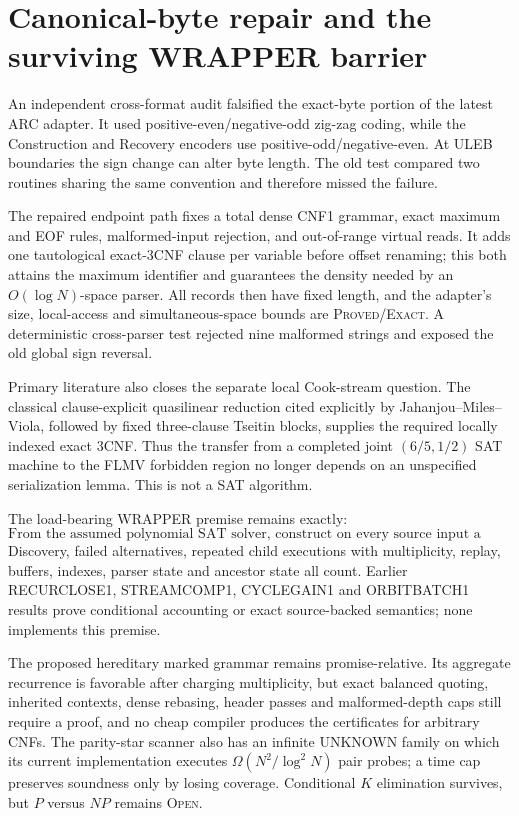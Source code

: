 \section{Canonical-byte repair and the surviving WRAPPER barrier}

An independent cross-format audit falsified the exact-byte portion of the
latest ARC adapter.  It used positive-even/negative-odd zig-zag coding, while
the Construction and Recovery encoders use positive-odd/negative-even.  At
ULEB boundaries the sign change can alter byte length.  The old test compared
two routines sharing the same convention and therefore missed the failure.

The repaired endpoint path fixes a total dense CNF1 grammar, exact maximum
and EOF rules, malformed-input rejection, and out-of-range virtual reads.  It
adds one tautological exact-3CNF clause per variable before offset renaming;
this both attains the maximum identifier and guarantees the density needed by
an $O(\log N)$-space parser.  All records then have fixed length, and the
adapter's size, local-access and simultaneous-space bounds are
\textsc{Proved/Exact}.  A deterministic cross-parser test rejected nine
malformed strings and exposed the old global sign reversal.

Primary literature also closes the separate local Cook-stream question.
The classical clause-explicit quasilinear reduction cited explicitly by
Jahanjou--Miles--Viola, followed by fixed three-clause Tseitin blocks, supplies
the required locally indexed exact 3CNF.  Thus the transfer from a completed
joint $(6/5,1/2)$ SAT machine to the FLMV forbidden region no longer depends
on an unspecified serialization lemma.  This is not a SAT algorithm.

The load-bearing WRAPPER premise remains exactly:
\[
 \boxed{\text{From the assumed polynomial SAT solver, construct on every
 source input a favorable phase before any parent-scale semantic call.}}
\]
Discovery, failed alternatives, repeated child executions with multiplicity,
replay, buffers, indexes, parser state and ancestor state all count.  Earlier
RECURCLOSE1, STREAMCOMP1, CYCLEGAIN1 and ORBITBATCH1 results prove conditional
accounting or exact source-backed semantics; none implements this premise.

The proposed hereditary marked grammar remains promise-relative.  Its
aggregate recurrence is favorable after charging multiplicity, but exact
balanced quoting, inherited contexts, dense rebasing, header passes and
malformed-depth caps still require a proof, and no cheap compiler produces
the certificates for arbitrary CNFs.  The parity-star scanner also has an
infinite UNKNOWN family on which its current implementation executes
$\Omega(N^2/\log^2N)$ pair probes; a time cap preserves soundness only by
losing coverage.  Conditional $K$ elimination survives, but $P$ versus $NP$
remains \textsc{Open}.

